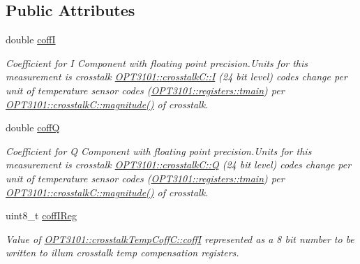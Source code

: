 \subsection*{Public Attributes}
\begin{DoxyCompactItemize}
\item 
double \mbox{\hyperlink{class_o_p_t3101_1_1crosstalk_temp_coff_c_ae4687a0b6bdbea7cd4fa1581e5e9cf24}{coffI}}
\begin{DoxyCompactList}\small\item\em Coefficient for I Component with floating point precision.\+Units for this measurement is crosstalk \mbox{\hyperlink{class_o_p_t3101_1_1crosstalk_c_a97152b209288a0dc30c4158fdc1815fc}{O\+P\+T3101\+::crosstalk\+C\+::I}} (24 bit level) codes change per unit of temperature sensor codes (\mbox{\hyperlink{class_o_p_t3101_1_1registers_a3dfd8d81d4cb04d274007deb7c6122fc}{O\+P\+T3101\+::registers\+::tmain}}) per \mbox{\hyperlink{class_o_p_t3101_1_1crosstalk_c_a3f569027c07fb3fb49a02ae3108e34c1}{O\+P\+T3101\+::crosstalk\+C\+::magnitude()}} of crosstalk. \end{DoxyCompactList}\item 
double \mbox{\hyperlink{class_o_p_t3101_1_1crosstalk_temp_coff_c_a468edb62fe09f0117c59ed5c2ec11e3b}{coffQ}}
\begin{DoxyCompactList}\small\item\em Coefficient for Q Component with floating point precision.\+Units for this measurement is crosstalk \mbox{\hyperlink{class_o_p_t3101_1_1crosstalk_c_a1e20d913baf2432ec90fe06a45c226db}{O\+P\+T3101\+::crosstalk\+C\+::Q}} (24 bit level) codes change per unit of temperature sensor codes (\mbox{\hyperlink{class_o_p_t3101_1_1registers_a3dfd8d81d4cb04d274007deb7c6122fc}{O\+P\+T3101\+::registers\+::tmain}}) per \mbox{\hyperlink{class_o_p_t3101_1_1crosstalk_c_a3f569027c07fb3fb49a02ae3108e34c1}{O\+P\+T3101\+::crosstalk\+C\+::magnitude()}} of crosstalk. \end{DoxyCompactList}\item 
uint8\+\_\+t \mbox{\hyperlink{class_o_p_t3101_1_1crosstalk_temp_coff_c_a28ab8d4219f159782b1af029bd876cac}{coff\+I\+Reg}}
\begin{DoxyCompactList}\small\item\em Value of \mbox{\hyperlink{class_o_p_t3101_1_1crosstalk_temp_coff_c_ae4687a0b6bdbea7cd4fa1581e5e9cf24}{O\+P\+T3101\+::crosstalk\+Temp\+Coff\+C\+::coffI}} represented as a 8 bit number to be written to illum crosstalk temp compensation registers. \end{DoxyCompactList}\item 

\end{DoxyCompactItemize}
